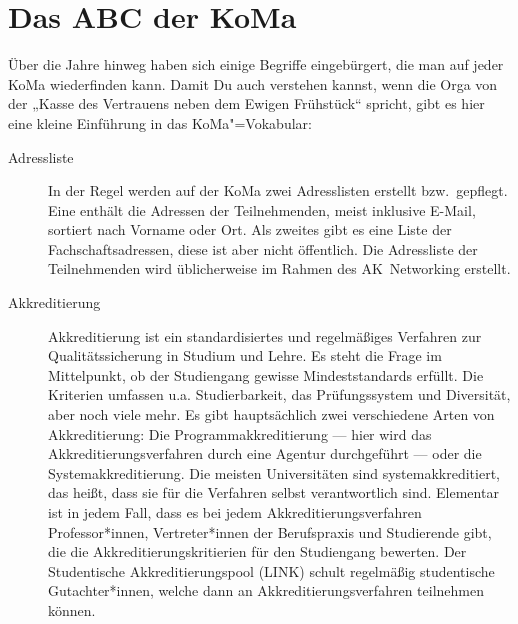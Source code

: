 \chapter{Das ABC der KoMa}



Über die Jahre hinweg haben sich einige Begriffe eingebürgert, die man auf jeder KoMa wiederfinden kann. Damit Du auch verstehen kannst, wenn die Orga von der „Kasse des Vertrauens neben dem Ewigen Frühstück“ spricht, gibt es hier eine kleine Einführung in das KoMa"=Vokabular:

\begin{description}

\item[Adressliste]
    In der Regel werden auf der KoMa zwei Adresslisten erstellt bzw.\ gepflegt. Eine enthält die Adressen der Teilnehmenden, meist inklusive E-Mail, sortiert nach Vorname oder Ort.  Als zweites gibt es eine Liste der Fachschaftsadressen, diese ist aber nicht öffentlich. Die Adressliste der Teilnehmenden wird üblicherweise im Rahmen des AK~Networking erstellt.

\item[Akkreditierung]
    Akkreditierung ist ein standardisiertes und regelmäßiges Verfahren zur Qualitätssicherung in Studium und Lehre. Es steht die Frage im Mittelpunkt, ob der Studiengang gewisse Mindeststandards erfüllt. Die Kriterien umfassen u.a. Studierbarkeit, das Prüfungssystem und Diversität, aber noch viele mehr. Es gibt hauptsächlich zwei verschiedene Arten von Akkreditierung: Die Programmakkreditierung — hier wird das Akkreditierungsverfahren durch eine Agentur durchgeführt — oder die Systemakkreditierung. Die meisten Universitäten sind systemakkreditiert, das heißt, dass sie für die Verfahren selbst verantwortlich sind. Elementar ist in jedem Fall, dass es bei jedem Akkreditierungsverfahren Professor*innen, Vertreter*innen der Berufspraxis und Studierende gibt, die die Akkreditierungskritierien für den Studiengang bewerten. Der Studentische Akkreditierungspool (LINK) schult regelmäßig studentische Gutachter*innen, welche dann an Akkreditierungsverfahren teilnehmen können.


\end{description}
